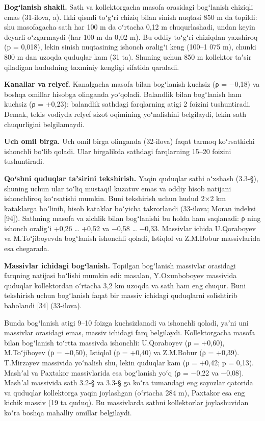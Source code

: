 \textbf{Bogʻlanish shakli.} Sath va kollektorgacha masofa orasidagi
bogʻlanish chiziqli emas (31-ilova, a). Ikki qismli toʻgʻri chiziq bilan
sinish nuqtasi 850 m da topildi: shu masofagacha sath har 100 m da
oʻrtacha 0,12 m chuqurlashadi, undan keyin deyarli oʻzgarmaydi (har 100
m da 0,02 m). Bu oddiy toʻgʻri chiziqdan yaxshiroq (p = 0,018), lekin
sinish nuqtasining ishonch oraligʻi keng (100--1 075 m), chunki 800 m
dan uzoqda quduqlar kam (31 ta). Shuning uchun 850 m kollektor taʼsir
qiladigan hududning taxminiy kengligi sifatida qaraladi.

\textbf{Kanallar va relyef.} Kanalgacha masofa bilan bogʻlanish kuchsiz
(ρ = −0,18) va boshqa omillar hisobga olinganda yoʻqoladi. Balandlik
bilan bogʻlanish ham kuchsiz (ρ = +0,23): balandlik sathdagi farqlarning
atigi 2 foizini tushuntiradi. Demak, tekis vodiyda relyef sizot
oqimining yoʻnalishini belgilaydi, lekin sath chuqurligini belgilamaydi.

\textbf{Uch omil birga.} Uch omil birga olinganda (32-ilova) faqat
tarmoq koʻrsatkichi ishonchli boʻlib qoladi. Ular birgalikda sathdagi
farqlarning 15--20 foizini tushuntiradi.

\textbf{Qoʻshni quduqlar taʼsirini tekshirish.} Yaqin quduqlar sathi
oʻxshash (3.3-§), shuning uchun ular toʻliq mustaqil kuzatuv emas va
oddiy hisob natijani ishonchliroq koʻrsatishi mumkin. Buni tekshirish
uchun hudud 2×2 km kataklarga boʻlinib, hisob kataklar boʻyicha
takrorlandi (33-ilova; Moran indeksi {[}94{]}). Sathning masofa va
zichlik bilan bogʻlanishi bu holda ham saqlanadi: ρ ning ishonch
oraligʻi +0,26 \ldots{} +0,52 va −0,58 \ldots{} −0,33. Massivlar ichida
U.Qoraboyev va M.Toʻjiboyevda bogʻlanish ishonchli qoladi, Istiqlol va
Z.M.Bobur massivlarida esa chegarada.

\textbf{Massivlar ichidagi bogʻlanish.} Topilgan bogʻlanish massivlar
orasidagi farqning natijasi boʻlishi mumkin edi: masalan, Y.Oxunboboyev
massivida quduqlar kollektordan oʻrtacha 3,2 km uzoqda va sath ham eng
chuqur. Buni tekshirish uchun bogʻlanish faqat bir massiv ichidagi
quduqlarni solishtirib baholandi {[}34{]} (33-ilova).

Bunda bogʻlanish atigi 9--10 foizga kuchsizlanadi va ishonchli qoladi,
yaʼni uni massivlar orasidagi emas, massiv ichidagi farq belgilaydi.
Kollektorgacha masofa bilan bogʻlanish toʻrtta massivda ishonchli:
U.Qoraboyev (ρ = +0,60), M.Toʻjiboyev (ρ = +0,50), Istiqlol (ρ = +0,40)
va Z.M.Bobur (ρ = +0,39). T.Mirzayev massivida yoʻnalish shu, lekin
quduqlar kam (ρ = +0,42; p = 0,13). Mashʼal va Paxtakor massivlarida esa
bogʻlanish yoʻq (ρ = −0,22 va −0,08). Mashʼal massivida sath 3.2-§ va
3.3-§ ga koʻra tumandagi eng sayozlar qatorida va quduqlar kollektorga
yaqin joylashgan (oʻrtacha 284 m), Paxtakor esa eng kichik massiv (19 ta
quduq). Bu massivlarda sathni kollektorlar joylashuvidan koʻra boshqa
mahalliy omillar belgilaydi.

